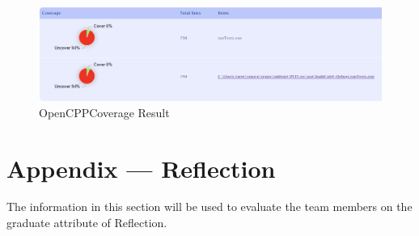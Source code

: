 \documentclass[12pt, titlepage]{article}
\begin{document}
\begin{figure}[h]
    \centering
    \includegraphics[width=1\textwidth]{Coverage.png} %
    \caption{OpenCPPCoverage Result}
    \label{fig:coverage}
\end{figure}




\newpage{}
\section*{Appendix --- Reflection}

The information in this section will be used to evaluate the team members on the
graduate attribute of Reflection.
\end{document}
